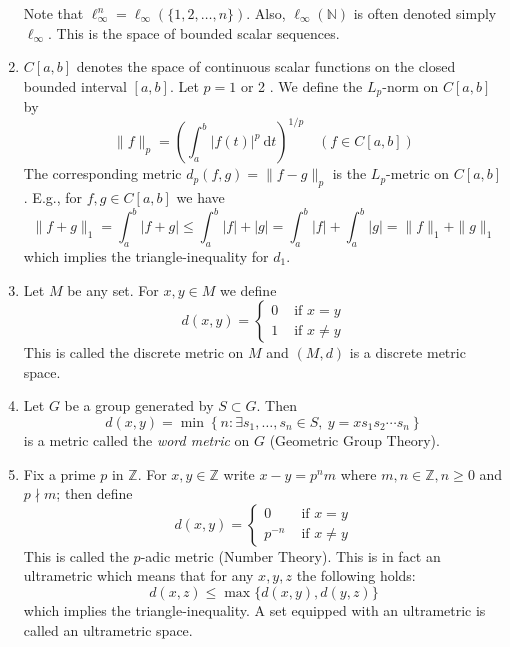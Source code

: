 \documentclass[a4paper,11pt]{article}
\begin{document}
\begin{example}
\begin{enumerate}
        Note that $\ell_{\infty}^{n}=\ell_{\infty}(\{1,2, \ldots, n\})$. Also, $\ell_{\infty}(\mathbb{N})$ is often denoted simply $\ell_{\infty}$. This is the space of bounded scalar sequences.
        \item $C[a, b]$ denotes the space of continuous scalar functions on the closed bounded interval $[a, b]$. Let $p=1$ or 2 . We define the $L_{p}$-norm on $C[a, b]$ by
        \[
        \|f\|_{p}=\left(\int_{a}^{b}|f(t)|^{p} \mathrm{~d} t\right)^{1 / p} \quad(f \in C[a, b])
        \]
        The corresponding metric $d_{p}(f, g)=\|f-g\|_{p}$ is the $L_{p}$-metric on $C[a, b]$. E.g., for $f, g \in C[a, b]$ we have
        \[
        \|f+g\|_{1}=\int_{a}^{b}|f+g| \leqslant \int_{a}^{b}|f|+|g|=\int_{a}^{b}|f|+\int_{a}^{b}|g|=\|f\|_{1}+\|g\|_{1}
        \]
        which implies the triangle-inequality for $d_{1}$.
        \item Let $M$ be any set. For $x, y \in M$ we define
        \[
        d(x, y)= \begin{cases}0 & \text { if } x=y \\ 1 & \text { if } x \neq y\end{cases}
        \]
        This is called the discrete metric on $M$ and $(M, d)$ is a discrete metric space.
        \item Let $G$ be a group generated by $S \subset G$. Then
        \[
        d(x, y)=\min \left\{n: \exists s_{1}, \ldots, s_{n} \in S,\ y=x s_{1} s_{2} \cdots s_{n}\right\}
        \]
        is a metric called the \textit{word metric} on $G$ (Geometric Group Theory).
        \item Fix a prime $p$ in $\mathbb{Z}$. For $x, y \in \mathbb{Z}$ write $x-y=p^{n} m$ where $m, n \in \mathbb{Z}, n \geqslant 0$ and $p \nmid m$; then define
        \[
        d(x, y)= \begin{cases}0 & \text { if } x=y \\ p^{-n} & \text { if } x \neq y\end{cases}
        \]
        This is called the $p$-adic metric (Number Theory). This is in fact an ultrametric which means that for any $x, y, z$ the following holds:
        \[
        d(x, z) \leqslant \max \{d(x, y), d(y, z)\}
        \]
        which implies the triangle-inequality. A set equipped with an ultrametric is called an ultrametric space.
    \end{enumerate}
\end{example}
\end{document}
